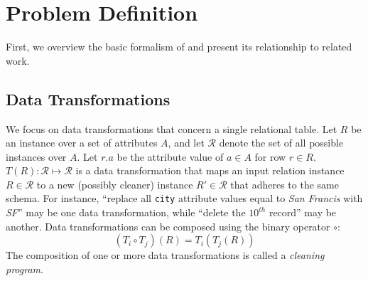 \section{Problem Definition}
First, we overview the basic formalism of \sys and present its relationship to related work.

\subsection{Data Transformations}
We focus on data transformations that concern a single relational table. 
Let $R$ be an instance over a set of attributes $A$, and let $\mathcal{R}$ denote the set of all possible instances over $A$.
Let $r.a$ be the attribute value of $a \in A$ for row $r \in R$.
$T(R): \mathcal{R} \mapsto \mathcal{R}$ is a data transformation that maps an input relation instance $R \in \mathcal{R}$ to a new (possibly cleaner) instance $R' \in \mathcal{R}$ that adheres to the same schema.  For instance, ``replace all \texttt{city} attribute values equal to {\it San Francis} with {\it SF}'' may be one data transformation, while ``delete the $10^{th}$ record'' may be another.   Data transformations can be composed using the binary operator $\circ$:
\[
(T_i \circ T_j)(R) =  T_i(T_j(R))
\]
The composition of one or more data transformations is called a {\it cleaning program}.   

